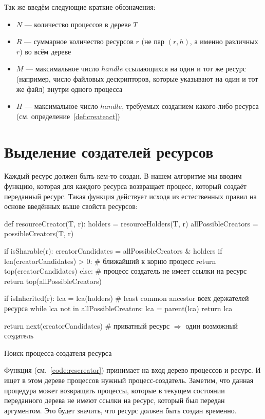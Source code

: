 Так же введём следующие краткие обозначения:
\begin{itemize}
	\item $N$ --- количество процессов в дереве $T$
	\item $R$ --- суммарное количество ресурсов $r$ (не пар $(r, h)$, а именно различных $r$) во всём дереве
	\item $M$ --- максимальное число $handle$ ссылающихся на один и тот же ресурс (например, число файловых дескрипторов, которые указывают на один и тот же файл) внутри одного процесса
	\item $H$ --- максимальное число $handle$, требуемых созданием какого-либо ресурса (см. определение~\ref{def:createact})
\end{itemize}

\section{Выделение создателей ресурсов}
\label{chap2:sec:setcreators}

Каждый ресурс должен быть кем-то создан. В нашем алгоритме мы вводим функцию, которая для каждого ресурса возвращает процесс, который создаёт переданный ресурс. Такая функция действует исходя из естественных правил на основе введённых выше свойств ресурсов:

\begin{listing}[ht!]
\begin{pythoncode}
def resourceCreator(T, r):
    holders =  resourceHolders(T, r)
    allPossibleCreators = possibleCreators(T, r)

    if isSharable(r):
        creatorCandidates = allPossibleCreators & holders
        if len(creatorCandidates) > 0:
             # ближайший к корню процесс
             return top(creatorCandidates)
        else:
             # процесс создатель не имеет ссылки на ресурс
             return top(allPossibleCreators)
       
    if isInherited(r): 
       lca = lca(holders)  # least common ancestor всех держателей ресурса
       while lca not in allPossibleCreators:
           lca = parent(lca)
       return lca

    return next(creatorCandidates)  # приватный ресурс $\Rightarrow$ один возможный создатель
\end{pythoncode}
\caption{Поиск процесса-создателя ресурса}
\label{code:rescreator}
\end{listing}

Функция (см.~\ref{code:rescreator}) принимает на вход дерево процессов и ресурс. И ищет в этом дереве процессов нужный процесс-создатель.
Заметим, что данная процедура может возвращать процессы, которые в текущем состоянии переданного дерева не имеют
ссылки на ресурс, который был передан аргументом. Это будет значить, что ресурс должен быть создан временно.


